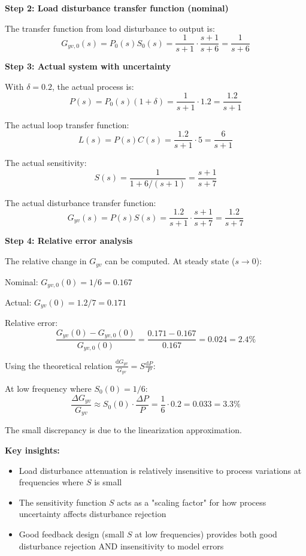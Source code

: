 \documentclass[11pt,a4paper]{article}
\begin{document}
\textbf{Step 2: Load disturbance transfer function (nominal)}

The transfer function from load disturbance to output is:
\begin{equation}
  G_{yv,0}(s) = P_0(s)S_0(s) = \frac{1}{s+1} \cdot \frac{s+1}{s+6} = \frac{1}{s+6}
\end{equation}

\textbf{Step 3: Actual system with uncertainty}

With $\delta = 0.2$, the actual process is:
\begin{equation}
  P(s) = P_0(s)(1 + \delta) = \frac{1}{s+1} \cdot 1.2 = \frac{1.2}{s+1}
\end{equation}

The actual loop transfer function:
\begin{equation}
  L(s) = P(s)C(s) = \frac{1.2}{s+1} \cdot 5 = \frac{6}{s+1}
\end{equation}

The actual sensitivity:
\begin{equation}
  S(s) = \frac{1}{1 + 6/(s+1)} = \frac{s+1}{s+7}
\end{equation}

The actual disturbance transfer function:
\begin{equation}
  G_{yv}(s) = P(s)S(s) = \frac{1.2}{s+1} \cdot \frac{s+1}{s+7} = \frac{1.2}{s+7}
\end{equation}

\textbf{Step 4: Relative error analysis}

The relative change in $G_{yv}$ can be computed. At steady state ($s \to 0$):

Nominal: $G_{yv,0}(0) = 1/6 = 0.167$

Actual: $G_{yv}(0) = 1.2/7 = 0.171$

Relative error:
\begin{equation}
  \frac{G_{yv}(0) - G_{yv,0}(0)}{G_{yv,0}(0)} = \frac{0.171 - 0.167}{0.167} = 0.024 = 2.4\%
\end{equation}

Using the theoretical relation $\frac{\mathrm{d}G_{yv}}{G_{yv}} = S\frac{\mathrm{d}P}{P}$:

At low frequency where $S_0(0) = 1/6$:
\begin{equation}
  \frac{\Delta G_{yv}}{G_{yv}} \approx S_0(0) \cdot \frac{\Delta P}{P} = \frac{1}{6} \cdot 0.2 = 0.033 = 3.3\%
\end{equation}

The small discrepancy is due to the linearization approximation.

\textbf{Key insights:}
\begin{itemize}
  \item Load disturbance attenuation is relatively insensitive to process variations at frequencies where $S$ is small
  \item The sensitivity function $S$ acts as a "scaling factor" for how process uncertainty affects disturbance rejection
  \item Good feedback design (small $S$ at low frequencies) provides both good disturbance rejection AND insensitivity to model errors
\end{itemize}
\end{document}
